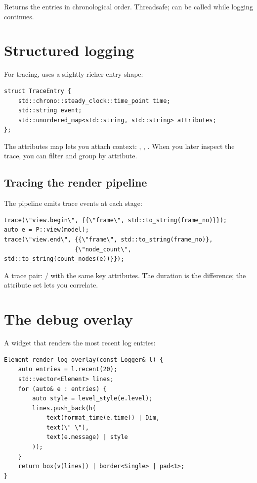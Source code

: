 Returns the entries in chronological order. Threadsafe; can be
called while logging continues.

\section{Structured logging}

For tracing, \maya{} uses a slightly richer entry shape:

\begin{lstlisting}
struct TraceEntry {
    std::chrono::steady_clock::time_point time;
    std::string event;
    std::unordered_map<std::string, std::string> attributes;
};
\end{lstlisting}

The attributes map lets you attach context: ,
, . When you
later inspect the trace, you can filter and group by attribute.

\subsection*{Tracing the render pipeline}

The pipeline emits trace events at each stage:

\begin{lstlisting}
trace(\"view.begin\", {{\"frame\", std::to_string(frame_no)}});
auto e = P::view(model);
trace(\"view.end\", {{\"frame\", std::to_string(frame_no)},
                    {\"node_count\", std::to_string(count_nodes(e))}});
\end{lstlisting}

A trace pair: / with the same key
attributes. The duration is the difference; the attribute set
lets you correlate.

\section{The debug overlay}

A widget that renders the most recent log entries:

\begin{lstlisting}
Element render_log_overlay(const Logger& l) {
    auto entries = l.recent(20);
    std::vector<Element> lines;
    for (auto& e : entries) {
        auto style = level_style(e.level);
        lines.push_back(h(
            text(format_time(e.time)) | Dim,
            text(\" \"),
            text(e.message) | style
        ));
    }
    return box(v(lines)) | border<Single> | pad<1>;
}
\end{lstlisting}

